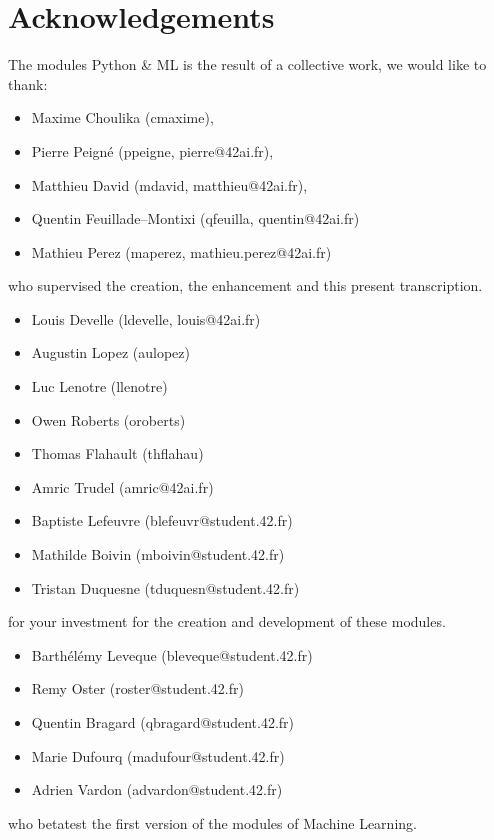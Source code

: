 \documentclass{42-en}
\begin{document}
\section*{Acknowledgements}
The modules Python \& ML is the result of a collective work, we would like to thank:
\begin{itemize}
  \item Maxime Choulika (cmaxime),
  \item Pierre Peigné (ppeigne, pierre@42ai.fr),
  \item Matthieu David (mdavid, matthieu@42ai.fr),
  \item Quentin Feuillade--Montixi (qfeuilla, quentin@42ai.fr)
  \item Mathieu Perez (maperez, mathieu.perez@42ai.fr)
\end{itemize}
who supervised the creation, the enhancement and this present transcription.

\begin{itemize}
    \item Louis Develle (ldevelle, louis@42ai.fr)
    \item Augustin Lopez (aulopez)
    \item Luc Lenotre (llenotre)
    \item Owen Roberts (oroberts)
    \item Thomas Flahault (thflahau)
    \item Amric Trudel (amric@42ai.fr)
    \item Baptiste Lefeuvre (blefeuvr@student.42.fr)
    \item Mathilde Boivin (mboivin@student.42.fr)
    \item Tristan Duquesne (tduquesn@student.42.fr)
\end{itemize}
for your investment for the creation and development of these modules.

\begin{itemize}
    \item Barthélémy Leveque (bleveque@student.42.fr)
    \item Remy Oster (roster@student.42.fr)
    \item Quentin Bragard (qbragard@student.42.fr)
    \item Marie Dufourq (madufour@student.42.fr)
    \item Adrien Vardon (advardon@student.42.fr)
\end{itemize}
who betatest the first version of the modules of Machine Learning.
\vfill
\doclicenseThis
\end{document}

